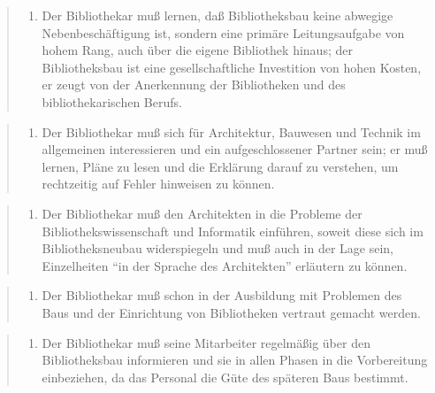 \documentclass[a4paper,
fontsize=11pt,
oneside,
numbers=noperiodatend,
parskip=half-,
bibliography=totoc,
final
]{scrartcl}
\begin{document}
\begin{quote}
\begin{enumerate}
\def\labelenumi{\arabic{enumi}.}
\setcounter{enumi}{2}
\itemsep1pt\parskip0pt
\item
  Der Bibliothekar muß lernen, daß Bibliotheksbau keine abwegige
  Nebenbe\-schäf\-tigung ist, sondern eine primäre Leitungsaufgabe von hohem
  Rang, auch über die eigene Bibliothek hinaus; der Bibliotheksbau ist
  eine gesellschaftliche Investition von hohen Kosten, er zeugt von der
  Anerkennung der Bibliotheken und des bibliothekarischen Berufs.
\end{enumerate}
\end{quote}

\begin{quote}
\begin{enumerate}
\def\labelenumi{\arabic{enumi}.}
\setcounter{enumi}{3}
\itemsep1pt\parskip0pt
\item
  Der Bibliothekar muß sich für Architektur, Bauwesen und Technik im
  allgemeinen interessieren und ein aufgeschlossener Partner sein; er
  muß lernen, Pläne zu lesen und die Erklärung darauf zu verstehen, um
  rechtzeitig auf Fehler hinweisen zu können.
\end{enumerate}
\end{quote}

\begin{quote}
\begin{enumerate}
\def\labelenumi{\arabic{enumi}.}
\setcounter{enumi}{4}
\itemsep1pt\parskip0pt
\item
  Der Bibliothekar muß den Architekten in die Probleme der
  Bibliothekswissenschaft und Informatik einführen, soweit diese sich im
  Bibliotheksneubau widerspiegeln und muß auch in der Lage sein,
  Einzelheiten \enquote{in der Sprache des Architekten} erläutern zu
  können.
\end{enumerate}
\end{quote}

\begin{quote}
\begin{enumerate}
\def\labelenumi{\arabic{enumi}.}
\setcounter{enumi}{5}
\itemsep1pt\parskip0pt
\item
  Der Bibliothekar muß schon in der Ausbildung mit Problemen des Baus
  und der Einrichtung von Bibliotheken vertraut gemacht werden.
\end{enumerate}
\end{quote}

\begin{quote}
\begin{enumerate}
\def\labelenumi{\arabic{enumi}.}
\setcounter{enumi}{6}
\itemsep1pt\parskip0pt
\item
  Der Bibliothekar muß seine Mitarbeiter regelmäßig über den
  Bibliotheksbau informieren und sie in allen Phasen in die Vorbereitung
  einbeziehen, da das Personal die Güte des späteren Baus bestimmt.
\end{enumerate}
\end{quote}
\end{document}
